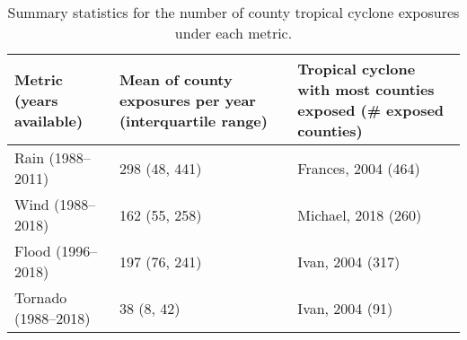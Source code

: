 \begin{table}[ht]
\centering
\caption{Summary statistics for the number of county tropical cyclone exposures under each metric.} 
\label{tab:exposuresummaries}
\begin{tabular}{p{4.5cm}p{4.5cm}p{4.5cm}}
  \toprule
Metric (years available) & Mean of county exposures per year (interquartile range) & Tropical cyclone with most counties exposed (\# exposed counties) \\ 
  \midrule
Rain (1988--2011) & 298 (48, 441) & Frances, 2004 (464) \\ 
  Wind (1988--2018) & 162 (55, 258) & Michael, 2018 (260) \\ 
  Flood (1996--2018) & 197 (76, 241) & Ivan, 2004 (317) \\ 
  Tornado (1988--2018) & 38 (8, 42) & Ivan, 2004 (91) \\ 
   \bottomrule
\end{tabular}
\end{table}
